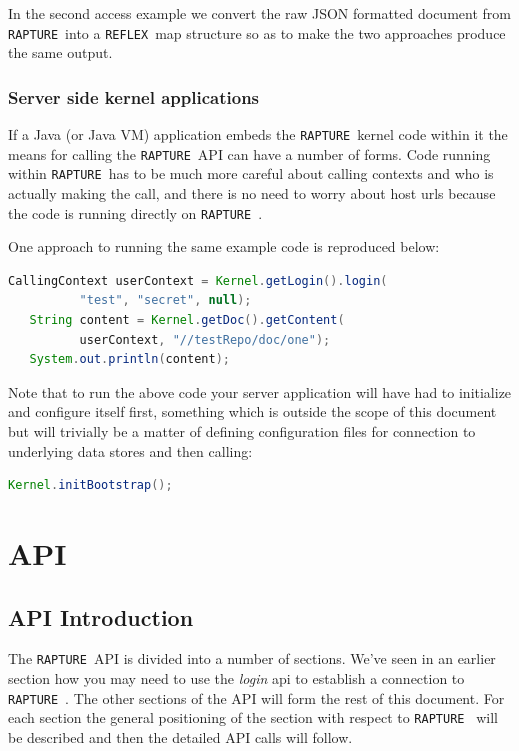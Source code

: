 \documentclass[12pt,twoside,a4paper]{book}
\newcommand{\Rapture}{\Verb+RAPTURE+~}
\newcommand{\Reflex}{\Verb+REFLEX+~}
\begin{document}
In the second access example we convert the raw JSON formatted document from
\Rapture into a \Reflex map structure so as to make the two approaches produce
the same output.

\section{Server side kernel applications}

If a Java (or Java VM) application embeds the \Rapture kernel code within it the
means for calling the \Rapture API can have a number of forms. Code running within
\Rapture has to be much more careful about calling contexts and who is actually
making the call, and there is no need to worry about host urls because the code
is running directly on \Rapture.

One approach to running the same example code is reproduced below:

\begin{lstlisting}[caption={Kernel simple example}, language=Java]
   CallingContext userContext = Kernel.getLogin().login(
          "test", "secret", null);
   String content = Kernel.getDoc().getContent(
          userContext, "//testRepo/doc/one");
   System.out.println(content);
\end{lstlisting}

Note that to run the above code your server application will have had to initialize
and configure itself first, something which is outside the scope of this document
but will trivially be a matter of defining configuration files for connection to
underlying data stores and then calling:

\begin{lstlisting}[caption={Kernel initialization}, language=Java]
   Kernel.initBootstrap();
\end{lstlisting}



\part{API}
\chapter{API Introduction}
The \Rapture API is divided into a number of sections. We've seen in an earlier
section how you may need to use the \emph{login} api to establish a connection
to \Rapture. The other sections of the API will form the rest of this document.
For each section the general positioning of the section with respect to \Rapture
will be described and then the detailed API calls will follow.
\end{document}
